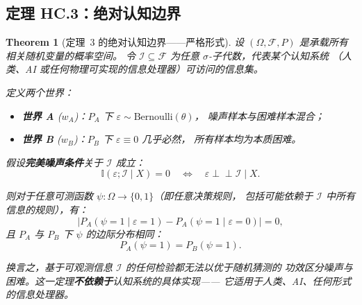 \documentclass[12pt,a4paper]{article}
\newtheorem{theorem}{Theorem}[section]
\newcommand{\I}{\mathbb{I}}
\newcommand{\cI}{\mathcal{I}}
\newcommand{\cF}{\mathcal{F}}
\begin{document}
\subsection{定理 HC.3：绝对认知边界}

\begin{theorem}[定理~3 的绝对认知边界——严格形式]
\label{thm:absolute-boundary}
设 $(\Omega, \cF, P)$ 是承载所有相关随机变量的概率空间。
令 $\cI \subseteq \cF$ 为任意 $\sigma$-子代数，代表某个认知系统
（人类、AI 或任何物理可实现的信息处理器）可访问的信息集。

定义两个世界：
\begin{itemize}
    \item \textbf{世界 A} ($w_A$)：$P_A$ 下 $\varepsilon \sim \mathrm{Bernoulli}(\theta)$，
          噪声样本与困难样本混合；
    \item \textbf{世界 B} ($w_B$)：$P_B$ 下 $\varepsilon \equiv 0$ 几乎必然，
          所有样本均为本质困难。
\end{itemize}

假设\textbf{完美噪声条件}关于 $\cI$ 成立：
\begin{equation}\label{eq:perfect-noise-assumption}
    \I(\varepsilon; \cI \mid X) = 0
    \quad\Longleftrightarrow\quad
    \varepsilon \perp\!\!\!\perp \cI \mid X.
\end{equation}

则对于任意可测函数 $\psi: \Omega \to \{0,1\}$（即任意决策规则，
包括可能依赖于 $\cI$ 中所有信息的规则），有：
\begin{equation}\label{eq:absolute-boundary-formal}
    \big| P_A(\psi=1 \mid \varepsilon=1) - P_A(\psi=1 \mid \varepsilon=0) \big| = 0,
\end{equation}
且 $P_A$ 与 $P_B$ 下 $\psi$ 的边际分布相同：
\begin{equation}
    P_A(\psi=1) = P_B(\psi=1).
\end{equation}

换言之，基于可观测信息 $\cI$ 的任何检验都无法以优于随机猜测的
功效区分噪声与困难。这一定理\textbf{不依赖于}认知系统的具体实现——
它适用于人类、AI、任何形式的信息处理器。
\label{thm:absolute-boundary-end}
\end{theorem}
\end{document}
